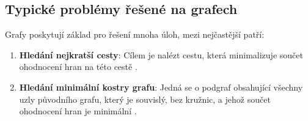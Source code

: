 \subsection{Typické problémy řešené na grafech}
Grafy poskytují základ pro řešení mnoha úloh, mezi nejčastější patří:
\begin{enumerate}
    \item \textbf{Hledání nejkratší cesty}: Cílem je nalézt cestu, která minimalizuje součet ohodnocení hran na této cestě \cite{geoinf9}.
    
    \item \textbf{Hledání minimální kostry grafu}:  Jedná se o podgraf obsahující všechny uzly původního grafu, který je souvislý, bez kružnic, a jehož součet ohodnocení hran je minimální \cite{geoinf9}.
\end{enumerate}

